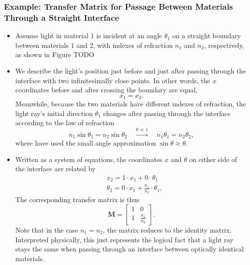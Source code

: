 \documentclass[11pt, a4paper]{article}
\newcommand{\mat}[1]{\mathbf{#1}} %
\begin{document}
\subsubsection{Example: Transfer Matrix for Passage Between Materials Through a Straight Interface} \label{sss:M-straight-boundary}
\begin{itemize}
    \item Assume light in material 1 is incident at an angle $ \theta_{1} $ on a straight boundary between materials 1 and 2, with indexes of refraction $ n_{1} $ and $ n_{2} $, respectively, as shown in Figure TODO

    \item We describe the light's position just before and just after passing through the interface with two infinitesimally close points. In other words, the $ x $ coordinates before and after crossing the boundary are equal,
    \begin{equation*}
        x_{1} = x_{2}.
    \end{equation*}
    Meanwhile, because the two materials have different indexes of refraction, the light ray's initial direction $ \theta_{1} $ changes after passing through the interface according to the law of refraction
    \begin{equation*}
        n_{1} \sin \theta_{1} = n_{2} \sin \theta_{2} \quad  \stackrel{\theta \ll 1}{\longrightarrow} \quad n_{1} \theta_{1} = n_{2} \theta_{2},
    \end{equation*}
    where have used the small angle approximation $ \sin \theta \approx \theta $.

    \item Written as a system of equations, the coordinates $ x $ and $ \theta $ on either side of the interface are related by
    \begin{align*}
        & x_{2} = 1\cdot x_{1} + 0 \cdot \theta_{1}\\
        & \theta_{2} = 0 \cdot x_{1} + \frac{n_{1}}{n_{2}} \cdot \theta_{1}.
    \end{align*}
    The corresponding transfer matrix is thus
    \begin{equation*}
        \mat{M} =
        \begin{bmatrix}
            1 & 0\\
            1 & \frac{n_{1}}{n_{2}}
        \end{bmatrix}.
    \end{equation*}
    Note that in the case $ n_{1} = n_{2} $, the matrix reduces to the identity matrix. Interpreted physically, this just represents the logical fact that a light ray stays the same when passing through an interface between optically identical materials.
    
\end{itemize}
\end{document}
